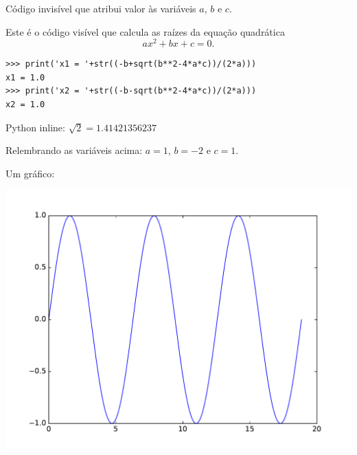 \documentclass{article}
\begin{document}
Código invisível que atribui valor às variáveis $a$, $b$ e $c$.




Este é o código visível que calcula as raízes da equação quadrática
$$ax^2+bx+c = 0.$$


\begin{verbatim}
>>> print('x1 = '+str((-b+sqrt(b**2-4*a*c))/(2*a)))
x1 = 1.0
>>> print('x2 = '+str((-b-sqrt(b**2-4*a*c))/(2*a)))
x2 = 1.0

\end{verbatim}


Python inline: $\sqrt{2} = 1.41421356237$

Relembrando as variáveis acima: $a = 1$, $b = -2$ e $c = 1$.

Um gráfico:


\includegraphics[width= \linewidth]{figures/exemplo_figure3_1.pdf}
\end{document}
